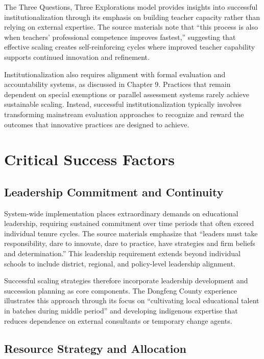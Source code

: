 \documentclass[
  Letterpaper,
]{scrbook}
\begin{document}
The Three Questions, Three Explorations model provides insights into
successful institutionalization through its emphasis on building teacher
capacity rather than relying on external expertise. The source materials
note that ``this process is also when teachers' professional competence
improves fastest,'' suggesting that effective scaling creates
self-reinforcing cycles where improved teacher capability supports
continued innovation and refinement.

Institutionalization also requires alignment with formal evaluation and
accountability systems, as discussed in Chapter 9. Practices that remain
dependent on special exemptions or parallel assessment systems rarely
achieve sustainable scaling. Instead, successful institutionalization
typically involves transforming mainstream evaluation approaches to
recognize and reward the outcomes that innovative practices are designed
to achieve.

\section{Critical Success Factors}\label{critical-success-factors}

\subsection{Leadership Commitment and
Continuity}\label{leadership-commitment-and-continuity}

System-wide implementation places extraordinary demands on educational
leadership, requiring sustained commitment over time periods that often
exceed individual tenure cycles. The source materials emphasize that
``leaders must take responsibility, dare to innovate, dare to practice,
have strategies and firm beliefs and determination.'' This leadership
requirement extends beyond individual schools to include district,
regional, and policy-level leadership alignment.

Successful scaling strategies therefore incorporate leadership
development and succession planning as core components. The Dongfeng
County experience illustrates this approach through its focus on
``cultivating local educational talent in batches during middle period''
and developing indigenous expertise that reduces dependence on external
consultants or temporary change agents.

\subsection{Resource Strategy and
Allocation}\label{resource-strategy-and-allocation}
\end{document}
